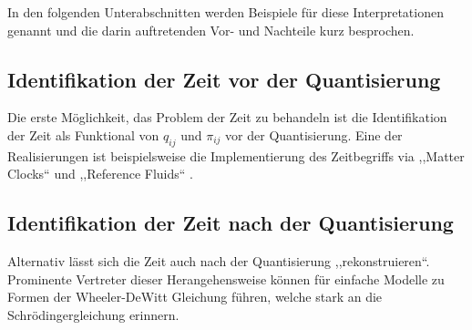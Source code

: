 \documentclass{scrartcl}
\begin{document}
		In den folgenden Unterabschnitten werden Beispiele für diese Interpretationen genannt
		und die darin auftretenden Vor- und Nachteile kurz besprochen.
		\subsection{Identifikation der Zeit vor der Quantisierung} %
			Die erste Möglichkeit, das Problem der Zeit zu behandeln ist die Identifikation der
			Zeit als Funktional von $q_{ij}$ und $\pi_{ij}$ vor der Quantisierung. Eine der Realisierungen
			ist beispielsweise die Implementierung des Zeitbegriffs via ,,Matter Clocks`` und ,,Reference Fluids`` \cite{PhysRevD.43.419,gr-qc/9210011}. %
		\subsection{Identifikation der Zeit nach der Quantisierung} %
			Alternativ lässt sich die Zeit auch nach der Quantisierung ,,rekonstruieren``. Prominente 
			Vertreter dieser Herangehensweise können für einfache Modelle zu Formen der Wheeler-DeWitt Gleichung
			führen, welche stark an die Schrödingergleichung erinnern.
			
\end{document}
